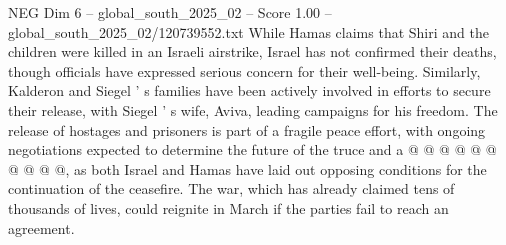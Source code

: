 \begin{textsample}{NEG Dim 6 – global\_south\_2025\_02 – Score 1.00 – global\_south\_2025\_02/120739552.txt}
While Hamas claims that Shiri and the children were killed in an Israeli airstrike, Israel has not confirmed their deaths, though officials have expressed serious concern for their well-being.
Similarly, Kalderon and Siegel ' s families have been actively involved in efforts to secure their release, with Siegel ' s wife, Aviva, leading campaigns for his freedom.
The release of hostages and prisoners is part of a fragile peace effort, with ongoing negotiations expected to determine the future of the truce and a @ @ @ @ @ @ @ @ @ @, as both Israel and Hamas have laid out opposing conditions for the continuation of the ceasefire.
The war, which has already claimed tens of thousands of lives, could reignite in March if the parties fail to reach an agreement.

\end{textsample}
